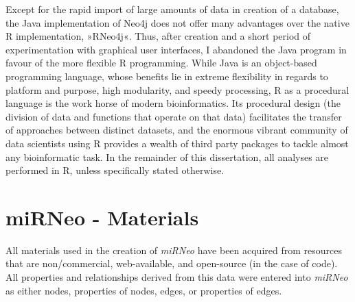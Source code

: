 Except for the rapid import of large amounts of data in creation of a database, the Java implementation of Neo4j does not offer many advantages over the native R implementation, »RNeo4j«. Thus, after creation and a short period of experimentation with graphical user interfaces, I abandoned the Java program in favour of the more flexible R programming. While Java is an object-based programming language, whose benefits lie in extreme flexibility in regards to platform and purpose, high modularity, and speedy processing, R as a procedural language is the work horse of modern bioinformatics. Its procedural design (the division of data and functions that operate on that data) facilitates the transfer of approaches between distinct datasets, and the enormous vibrant community of data scientists using R provides a wealth of third party packages to tackle almost any bioinformatic task. In the remainder of this dissertation, all analyses are performed in R, unless specifically stated otherwise.


\section{miRNeo - Materials}
All materials used in the creation of \textit{miRNeo} have been acquired from resources that are non\-/commercial, web-available, and open-source (in the case of code). All properties and relationships derived from this data were entered into \textit{miRNeo} as either nodes, properties of nodes, edges, or properties of edges. 


